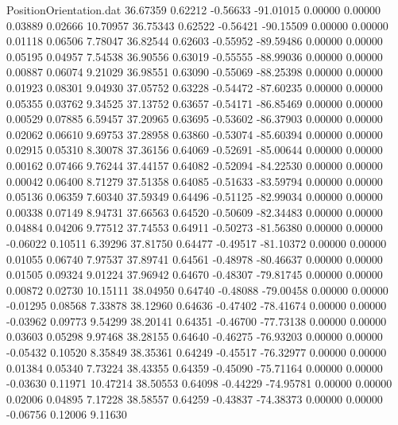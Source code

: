 \begin{filecontents}{PositionOrientation.dat}
  36.67359    0.62212   -0.56633   -91.01015    0.00000    0.00000    0.03889    0.02666   10.70957
  36.75343    0.62522   -0.56421   -90.15509    0.00000    0.00000    0.01118    0.06506    7.78047
  36.82544    0.62603   -0.55952   -89.59486    0.00000    0.00000    0.05195    0.04957    7.54538
  36.90556    0.63019   -0.55555   -88.99036    0.00000    0.00000    0.00887    0.06074    9.21029
  36.98551    0.63090   -0.55069   -88.25398    0.00000    0.00000    0.01923    0.08301    9.04930
  37.05752    0.63228   -0.54472   -87.60235    0.00000    0.00000    0.05355    0.03762    9.34525
  37.13752    0.63657   -0.54171   -86.85469    0.00000    0.00000    0.00529    0.07885    6.59457
  37.20965    0.63695   -0.53602   -86.37903    0.00000    0.00000    0.02062    0.06610    9.69753
  37.28958    0.63860   -0.53074   -85.60394    0.00000    0.00000    0.02915    0.05310    8.30078
  37.36156    0.64069   -0.52691   -85.00644    0.00000    0.00000    0.00162    0.07466    9.76244
  37.44157    0.64082   -0.52094   -84.22530    0.00000    0.00000    0.00042    0.06400    8.71279
  37.51358    0.64085   -0.51633   -83.59794    0.00000    0.00000    0.05136    0.06359    7.60340
  37.59349    0.64496   -0.51125   -82.99034    0.00000    0.00000    0.00338    0.07149    8.94731
  37.66563    0.64520   -0.50609   -82.34483    0.00000    0.00000    0.04884    0.04206    9.77512
  37.74553    0.64911   -0.50273   -81.56380    0.00000    0.00000   -0.06022    0.10511    6.39296
  37.81750    0.64477   -0.49517   -81.10372    0.00000    0.00000    0.01055    0.06740    7.97537
  37.89741    0.64561   -0.48978   -80.46637    0.00000    0.00000    0.01505    0.09324    9.01224
  37.96942    0.64670   -0.48307   -79.81745    0.00000    0.00000    0.00872    0.02730   10.15111
  38.04950    0.64740   -0.48088   -79.00458    0.00000    0.00000   -0.01295    0.08568    7.33878
  38.12960    0.64636   -0.47402   -78.41674    0.00000    0.00000   -0.03962    0.09773    9.54299
  38.20141    0.64351   -0.46700   -77.73138    0.00000    0.00000    0.03603    0.05298    9.97468
  38.28155    0.64640   -0.46275   -76.93203    0.00000    0.00000   -0.05432    0.10520    8.35849
  38.35361    0.64249   -0.45517   -76.32977    0.00000    0.00000    0.01384    0.05340    7.73224
  38.43355    0.64359   -0.45090   -75.71164    0.00000    0.00000   -0.03630    0.11971   10.47214
  38.50553    0.64098   -0.44229   -74.95781    0.00000    0.00000    0.02006    0.04895    7.17228
  38.58557    0.64259   -0.43837   -74.38373    0.00000    0.00000   -0.06756    0.12006    9.11630

\end{filecontents}
